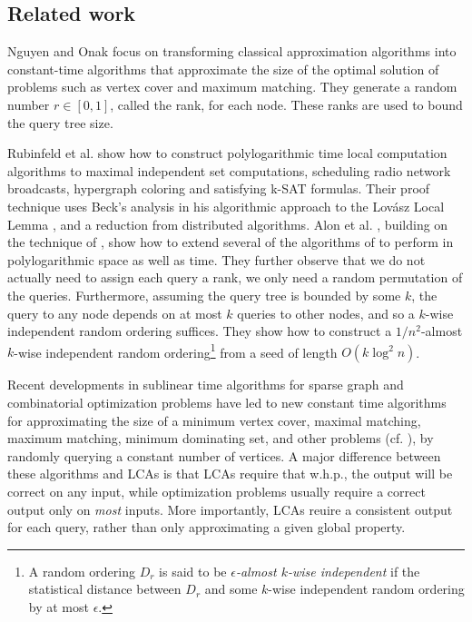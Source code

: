\documentclass[english, oribibl]{llncs}
\begin{document}
\subsection{Related work}
Nguyen and Onak \cite{NO08} focus on transforming classical approximation algorithms into constant-time algorithms that approximate the size of the optimal solution of problems such as vertex cover and  maximum matching. They generate a random number $r \in [0, 1]$, called the rank, for each node. These ranks are used to bound the query tree size. 

Rubinfeld et al. \cite{RTVX11} show how to construct polylogarithmic time local computation algorithms to maximal independent set computations, scheduling radio network broadcasts, hypergraph coloring and satisfying k-SAT formulas. Their proof technique uses Beck's analysis in
his algorithmic approach to the Lov{\'{a}}sz Local Lemma \cite{Bec91}, and a reduction from distributed algorithms. 
Alon et al. \cite{ARV+11}, building on the technique of \cite{NO08}, show how to extend several of the algorithms of \cite{RTVX11} to perform in polylogarithmic space as well as time. They further observe that we do not actually need to assign each query  a rank, we only need a random permutation of the queries. Furthermore, assuming the query tree is bounded by some $k$, the query to any node depends on at most $k$ queries to other nodes, and so a $k$-wise independent random ordering suffices. They show  how to construct a $1/n^2$-almost $k$-wise independent random ordering\footnote{A random ordering $D_r$ is said to be \emph{$\epsilon$-almost $k$-wise independent} if the statistical distance between $D_r$ and some $k$-wise independent random ordering by at most $\epsilon$.} from a seed of length $O(k \log^2{n})$. 





Recent developments in sublinear time algorithms for sparse graph and
combinatorial optimization problems have led to new constant time
algorithms for approximating the size of a minimum vertex cover, maximal matching, 
maximum matching, minimum dominating set, and other problems (cf. \cite{PR07, MR06, NO08, YYI09}), by 
randomly querying a constant number of vertices.
A major difference between these algorithms and LCAs is that LCAs require that w.h.p., the 
output will be correct on any input, while optimization problems usually require a correct output only on \emph{most} inputs. More importantly, LCAs reuire a consistent output for each query, rather than only approximating a given global property.
\end{document}
